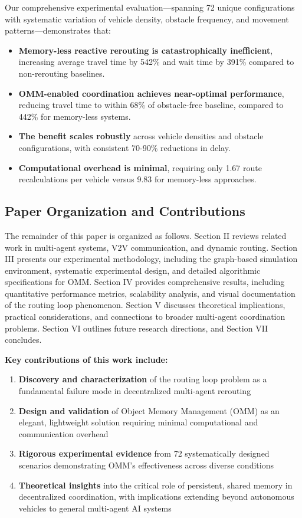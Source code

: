 \documentclass[conference]{IEEEtran}
\begin{document}
Our comprehensive experimental evaluation—spanning 72 unique configurations with systematic variation of vehicle density, obstacle frequency, and movement patterns—demonstrates that:
\begin{itemize}
    \item \textbf{Memory-less reactive rerouting is catastrophically inefficient}, increasing average travel time by 542\% and wait time by 391\% compared to non-rerouting baselines.
    \item \textbf{OMM-enabled coordination achieves near-optimal performance}, reducing travel time to within 68\% of obstacle-free baseline, compared to 442\% for memory-less systems.
    \item \textbf{The benefit scales robustly} across vehicle densities and obstacle configurations, with consistent 70-90\% reductions in delay.
    \item \textbf{Computational overhead is minimal}, requiring only 1.67 route recalculations per vehicle versus 9.83 for memory-less approaches.
\end{itemize}

\subsection{Paper Organization and Contributions}

The remainder of this paper is organized as follows. Section II reviews related work in multi-agent systems, V2V communication, and dynamic routing. Section III presents our experimental methodology, including the graph-based simulation environment, systematic experimental design, and detailed algorithmic specifications for OMM. Section IV provides comprehensive results, including quantitative performance metrics, scalability analysis, and visual documentation of the routing loop phenomenon. Section V discusses theoretical implications, practical considerations, and connections to broader multi-agent coordination problems. Section VI outlines future research directions, and Section VII concludes.

\textbf{Key contributions of this work include:}
\begin{enumerate}
    \item \textbf{Discovery and characterization} of the routing loop problem as a fundamental failure mode in decentralized multi-agent rerouting
    \item \textbf{Design and validation} of Object Memory Management (OMM) as an elegant, lightweight solution requiring minimal computational and communication overhead
    \item \textbf{Rigorous experimental evidence} from 72 systematically designed scenarios demonstrating OMM's effectiveness across diverse conditions
    \item \textbf{Theoretical insights} into the critical role of persistent, shared memory in decentralized coordination, with implications extending beyond autonomous vehicles to general multi-agent AI systems
\end{enumerate}
\end{document}
